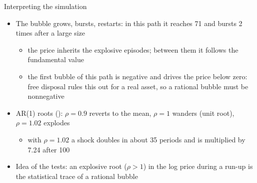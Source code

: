 \begin{frame}{Interpreting the simulation}
\itemsize{\small}
\begin{itemize}
    \item The bubble grows, bursts, restarts: in this path it reaches 71 and bursts 2 times after a large size
    \begin{itemize}
        \item the price inherits the explosive episodes; between them it follows the fundamental value
        \item the first bubble of this path is negative and drives the price below zero: free disposal rules this out for a real asset, so a rational bubble must be nonnegative
    \end{itemize}
    \item AR(1) roots (): $\rho = 0.9$ reverts to the mean, $\rho = 1$ wanders (unit root), $\rho = 1.02$ explodes
    \begin{itemize}
        \item with $\rho = 1.02$ a shock doubles in about 35 periods and is multiplied by 7.24 after 100
    \end{itemize}
    \item Idea of the tests: an explosive root ($\rho > 1$) in the log price during a run-up is the statistical trace of a rational bubble
\end{itemize}
\end{frame}

